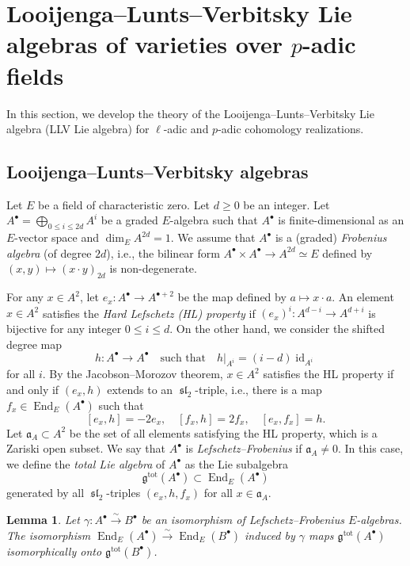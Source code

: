 \documentclass[12pt,reqno]{amsart}
\newtheorem{lem}[thm]{Lemma}
\theoremstyle{definition}
\newcommand\End{\mathop{\mathrm{End}}\nolimits}
\newcommand\id{\mathop{\mathrm{id}}\nolimits}
\newcommand{\fsl}{\mathop{\mathfrak{sl}}\nolimits}
\newcommand{\frg}{\mathfrak{g}}
\DeclareMathOperator{\tot}{tot}
\numberwithin{equation}{section}
\begin{document}
\section{Looijenga--Lunts--Verbitsky Lie algebras of varieties over $p$-adic fields}\label{Section:Looijenga--Lunts--Verbitsky algebras}

In this section, we develop the theory of 
the Looijenga--Lunts--Verbitsky Lie algebra (LLV Lie algebra) for $\ell$-adic and $p$-adic cohomology realizations.

\subsection{Looijenga--Lunts--Verbitsky algebras}\label{subsection:Looijenga--Lunts--Verbitsky algebras}
Let $E$ be a field of characteristic zero.
Let $d \geq 0$ be an integer.
Let $A^{\bullet} = \bigoplus_{0 \leq i \leq 2d} A^i$ be a graded $E$-algebra such that
$A^{\bullet}$ is finite-dimensional as an $E$-vector space and $\dim_E A^{2d} =1$.
We assume that $A^{\bullet}$ is a (graded) \emph{Frobenius algebra} (of degree $2d$),
i.e., the bilinear form
$A^{\bullet} \times A^{\bullet} \to A^{2d} \simeq E$
defined by $(x,y) \mapsto  (x\cdot y)_{2d}$ is non-degenerate.

For any $x \in A^2$,
let $e_x \colon A^{\bullet} \to A^{\bullet +2}$ be the map defined by
$a \mapsto x \cdot a$.
An element $x \in A^2$ satisfies the \emph{Hard Lefschetz (HL) property} if
$
(e_x)^i \colon A^{d-i} \to A^{d+i}
$
is bijective for any integer $0 \leq i \leq d$. On the other hand, we consider the shifted degree map
\[
h \colon A^{\bullet} \to A^{\bullet} \quad \text{such that} \quad h|_{A^{i}} = (i-d)\id_{A^i}
\]
for all $i$. By the Jacobson--Morozov theorem, $x\in A^2$ satisfies the HL property if and only if $(e_x,h)$ extends to an $\fsl_2$-triple, i.e., there is a map $f_x \in \End_{E}(A^{\bullet})$ such that
\[
[e_x, h] = -2e_x, \quad [f_x, h] = 2f_x, \quad [e_x,f_x] = h.
\]
Let $\mathfrak{a}_A \subset A^2$ be the set of all elements satisfying the HL property, which is a Zariski open subset.
We say that $A^{\bullet}$ is \emph{Lefschetz--Frobenius} if $\mathfrak{a}_A \neq 0$.
In this case, we define the \emph{total Lie algebra} of $A^{\bullet}$ as the Lie subalgebra
\[
\frg^{\tot}(A^{\bullet}) \subset \End_{E}(A^{\bullet})
\]
generated by all $\fsl_2$-triples $(e_x, h, f_x)$ for all $x \in \mathfrak{a}_{A}$.


\begin{lem}\label{lem:LLVundercomparison}
    Let $\gamma \colon A^{\bullet} \xrightarrow{\sim} B^{\bullet}$ be an isomorphism of Lefschetz--Frobenius $E$-algebras.
    The isomorphism
    $\End_E(A^{\bullet}) \xrightarrow{\sim} \End_E(B^{\bullet})$
    induced by $\gamma$
    maps $\frg^{\tot}(A^{\bullet})$ isomorphically onto $\frg^{\tot}(B^{\bullet})$.
\end{lem}
\end{document}

